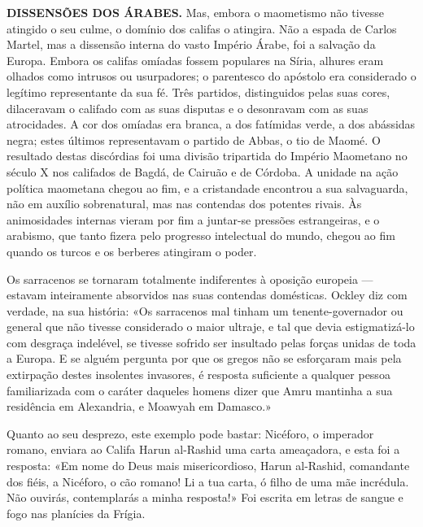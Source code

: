 \documentclass[11pt,a5paper,twoside,openany]{book}
\begin{document}
\textbf{DISSENSÕES DOS ÁRABES.} Mas, embora o maometismo não tivesse atingido o seu culme, o domínio dos califas o atingira. Não a espada de Carlos Martel, mas a dissensão interna do vasto Império Árabe, foi a salvação da Europa. Embora os califas omíadas fossem populares na Síria, alhures eram olhados como intrusos ou usurpadores; o parentesco do apóstolo era considerado o legítimo representante da sua fé. Três partidos, distinguidos pelas suas cores, dilaceravam o califado com as suas disputas e o desonravam com as suas atrocidades. A cor dos omíadas era branca, a dos fatímidas verde, a dos abássidas negra; estes últimos representavam o partido de Abbas, o tio de Maomé. O resultado destas discórdias foi uma divisão tripartida do Império Maometano no século X nos califados de Bagdá, de Cairuão e de Córdoba. A unidade na ação política maometana chegou ao fim, e a cristandade encontrou a sua salvaguarda, não em auxílio sobrenatural, mas nas contendas dos potentes rivais. Às animosidades internas vieram por fim a juntar-se pressões estrangeiras, e o arabismo, que tanto fizera pelo progresso intelectual do mundo, chegou ao fim quando os turcos e os berberes atingiram o poder.

Os sarracenos se tornaram totalmente indiferentes à oposição europeia — estavam inteiramente absorvidos nas suas contendas domésticas. Ockley diz com verdade, na sua história: «Os sarracenos mal tinham um tenente-governador ou general que não tivesse considerado o maior ultraje, e tal que devia estigmatizá-lo com desgraça indelével, se tivesse sofrido ser insultado pelas forças unidas de toda a Europa. E se alguém pergunta por que os gregos não se esforçaram mais pela extirpação destes insolentes invasores, é resposta suficiente a qualquer pessoa familiarizada com o caráter daqueles homens dizer que Amru mantinha a sua residência em Alexandria, e Moawyah em Damasco.»

Quanto ao seu desprezo, este exemplo pode bastar: Nicéforo, o imperador romano, enviara ao Califa Harun al-Rashid uma carta ameaçadora, e esta foi a resposta: «Em nome do Deus mais misericordioso, Harun al-Rashid, comandante dos fiéis, a Nicéforo, o cão romano! Li a tua carta, ó filho de uma mãe incrédula. Não ouvirás, contemplarás a minha resposta!» Foi escrita em letras de sangue e fogo nas planícies da Frígia.
\end{document}
